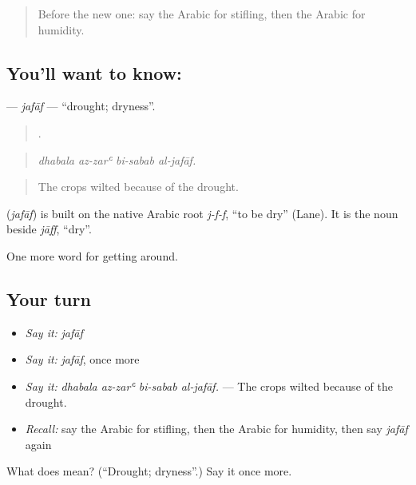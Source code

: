 \begin{quote}
Before the new one: say the Arabic for stifling, then the Arabic for humidity.
\end{quote}

\subsection*{You'll want to know: }
\textbf{} — \emph{jafāf} — \textquotedblleft{}drought; dryness\textquotedblright{}.

\begin{quote}
   .
\end{quote}

\begin{quote}
\emph{dhabala az-zarʿ bi-sabab al-jafāf.}
\end{quote}

\begin{quote}
The crops wilted because of the drought.
\end{quote}

\begin{cousinweb}
\textbf{} (\emph{jafāf}) is built on the native Arabic root \emph{j-f-f}, \textquotedblleft{}to be dry\textquotedblright{} (Lane). It is the noun beside \emph{jāff}, \textquotedblleft{}dry\textquotedblright{}.
\end{cousinweb}

\begin{grammarlens}[title={What you've built}]
One more word for getting around.
\end{grammarlens}

\subsection*{Your turn}
\begin{itemize}
\raggedright
  \item \emph{Say it:} \emph{jafāf}
  \item \emph{Say it:} \emph{jafāf}, once more
  \item \emph{Say it:} \emph{dhabala az-zarʿ bi-sabab al-jafāf.} — The crops wilted because of the drought.
  \item \emph{Recall:} say the Arabic for stifling, then the Arabic for humidity, then say \emph{jafāf} again
\end{itemize}

\begin{tcolorbox}[breakable,colback=teal!4,colframe=teal!35!black,title={Before you move on}]
What does  mean? (\textquotedblleft{}Drought; dryness\textquotedblright{}.) Say it once more.
\end{tcolorbox}
